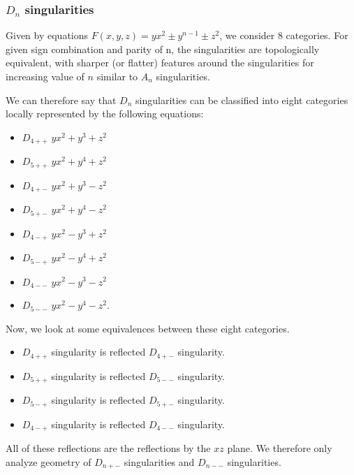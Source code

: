 \subsubsection*{$D_n$ singularities}

Given by equations $F(x,y,z)=yx^2\pm y^{n-1}\pm z^2$, we consider 8 categories.
For given sign combination and parity of n, the singularities are topologically
equivalent, with sharper (or flatter) features around the singularities for increasing
value of $n$ similar to $A_n$ singularities.

We can therefore say that $D_n$ singularities can be classified into eight categories
locally represented by the following equations:
\begin{itemize}
    \item $D_{4++}$ \hspace{5mm} $yx^2 + y^3 + z^2$
    \item $D_{5++}$ \hspace{5mm} $yx^2 + y^4 + z^2$
    \item $D_{4+-}$ \hspace{5mm} $yx^2 + y^3 - z^2$
    \item $D_{5+-}$ \hspace{5mm} $yx^2 + y^4 - z^2$
    \item $D_{4-+}$ \hspace{5mm} $yx^2 - y^3 + z^2$
    \item $D_{5-+}$ \hspace{5mm} $yx^2 - y^4 + z^2$
    \item $D_{4--}$ \hspace{5mm} $yx^2 - y^3 - z^2$
    \item $D_{5--}$ \hspace{5mm} $yx^2 - y^4 - z^2$.
\end{itemize}

Now, we look at some equivalences between these eight categories.
\begin{itemize}
    \item $D_{4++}$ singularity is reflected $D_{4+-}$ singularity.
    \item $D_{5++}$ singularity is reflected $D_{5--}$ singularity.
    \item $D_{5-+}$ singularity is reflected $D_{5+-}$ singularity.
    \item $D_{4-+}$ singularity is reflected $D_{4--}$ singularity.
\end{itemize}

All of these reflections are the reflections by the $xz$ plane. 
We therefore only analyze geometry of $D_{n+-}$ singularities and
$D_{n--}$ singularities.


